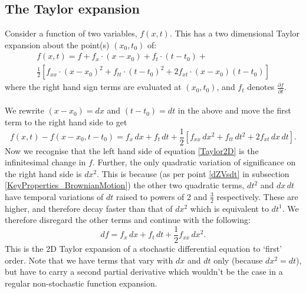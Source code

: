 \documentclass[12pt]{article}
\begin{document}
\subsection{The Taylor expansion}
Consider a function of two variables, $f(x,t)$. This has a two dimensional Taylor expansion about the point(s) $(x_0,t_0)$ of:
\begin{multline}
	f(x,t)=f + f_x\cdot(x-x_0) + f_t\cdot(t-t_0) + \\ \frac{1}{2}\left[f_{xx}\cdot(x-x_0)^2 + f_{tt}\cdot(t-t_0)^2 + 2f_{xt}\cdot(x-x_0)(t-t_0)\right]
\end{multline}
\noindent where the right hand sign terms are evaluated at $(x_0,t_0)$, and $f_t$ denotes $\frac{\partial f}{\partial t}$.\\
\\
We rewrite $(x-x_0)=dx$ and $(t-t_0)=dt$ in the above and move the first term to the right hand side to get
\begin{equation}\label{Taylor2D}
	f(x,t)-f(x-x_0,t-t_0)=f_x\,dx + f_t\,dt + \frac{1}{2}\left[f_{xx}\,dx^2 + f_{tt}\,dt^2 + 2f_{xt}\,dx\,dt\right].
\end{equation}
\noindent Now we recognise that the left hand side of equation \ref{Taylor2D} is the infinitesimal change in $f$. Further, the only quadratic variation of significance on the right hand side is $dx^2$. This is because (as per point \ref{dZVsdt} in subsection \ref{KeyProperties_BrownianMotion}) the other two quadratic terms, $dt^2$ and $dx\,dt$ have temporal variations of $dt$ raised to powers of 2 and $\frac{3}{2}$ respectively. These are higher, and therefore decay faster than that of $dx^2$ which is equivalent to $dt^1$. We therefore disregard the other terms and continue with the following:
\begin{equation}\label{Taylor2DFirstOrder}
	df=f_x\,dx+f_t\,dt+\frac{1}{2}f_{xx}\,dx^2.
\end{equation}
\noindent This is the 2D Taylor expansion of a stochastic differential equation to `first' order. Note that we have terms that vary with $dx$ and $dt$ only (because $dx^2=dt$), but have to carry a second partial derivative which wouldn't be the case in a regular non-stochastic function expansion.
\end{document}

